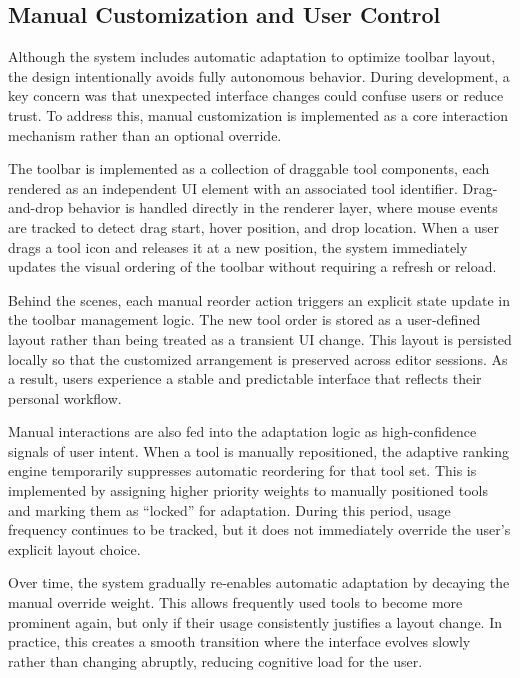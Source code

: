 \documentclass[sigconf]{acmart}
\begin{document}
\subsection{Manual Customization and User Control}

Although the system includes automatic adaptation to optimize toolbar layout, the design intentionally avoids fully autonomous behavior. During development, a key concern was that unexpected interface changes could confuse users or reduce trust. To address this, manual customization is implemented as a core interaction mechanism rather than an optional override.

The toolbar is implemented as a collection of draggable tool components, each rendered as an independent UI element with an associated tool identifier. Drag-and-drop behavior is handled directly in the renderer layer, where mouse events are tracked to detect drag start, hover position, and drop location. When a user drags a tool icon and releases it at a new position, the system immediately updates the visual ordering of the toolbar without requiring a refresh or reload.

Behind the scenes, each manual reorder action triggers an explicit state update in the toolbar management logic. The new tool order is stored as a user-defined layout rather than being treated as a transient UI change. This layout is persisted locally so that the customized arrangement is preserved across editor sessions. As a result, users experience a stable and predictable interface that reflects their personal workflow.

Manual interactions are also fed into the adaptation logic as high-confidence signals of user intent. When a tool is manually repositioned, the adaptive ranking engine temporarily suppresses automatic reordering for that tool set. This is implemented by assigning higher priority weights to manually positioned tools and marking them as “locked” for adaptation. During this period, usage frequency continues to be tracked, but it does not immediately override the user’s explicit layout choice.

Over time, the system gradually re-enables automatic adaptation by decaying the manual override weight. This allows frequently used tools to become more prominent again, but only if their usage consistently justifies a layout change. In practice, this creates a smooth transition where the interface evolves slowly rather than changing abruptly, reducing cognitive load for the user.
\end{document}
